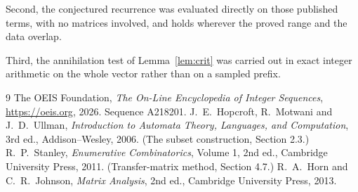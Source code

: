 \documentclass[11pt,a4paper]{article}
\theoremstyle{plain}
\theoremstyle{definition}
\begin{document}
Second, the conjectured recurrence was evaluated directly on those published terms, with no
matrices involved, and holds wherever the proved range and the data overlap.

Third, the annihilation test of Lemma~\ref{lem:crit} was carried out in exact integer
arithmetic on the whole vector rather than on a sampled prefix.

\begin{thebibliography}{9}
 The OEIS Foundation, \emph{The On-Line Encyclopedia of Integer
Sequences}, \url{https://oeis.org}, 2026. Sequence A218201.
 J.~E.~Hopcroft, R.~Motwani and J.~D.~Ullman, \emph{Introduction to Automata
Theory, Languages, and Computation}, 3rd ed., Addison--Wesley, 2006. (The subset
construction, Section 2.3.)
 R.~P.~Stanley, \emph{Enumerative Combinatorics}, Volume 1, 2nd ed.,
Cambridge University Press, 2011. (Transfer-matrix method, Section 4.7.)
 R.~A.~Horn and C.~R.~Johnson, \emph{Matrix Analysis}, 2nd ed., Cambridge
University Press, 2013.
\end{thebibliography}
\end{document}
